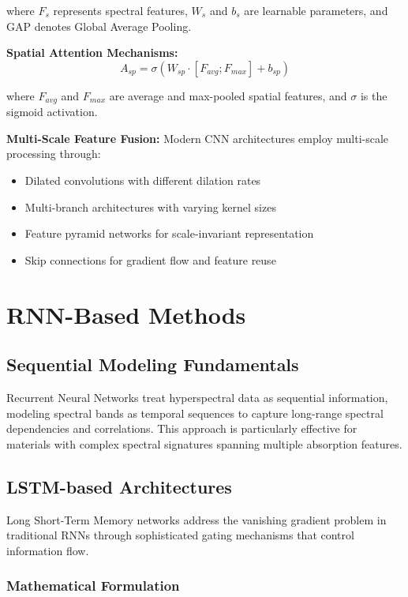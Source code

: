 \documentclass[journal]{IEEEtran}
\begin{document}
where $F_s$ represents spectral features, $W_s$ and $b_s$ are learnable parameters, and GAP denotes Global Average Pooling.

\textbf{Spatial Attention Mechanisms:}
\begin{equation}
A_{sp} = \sigma(W_{sp} \cdot [F_{avg}; F_{max}] + b_{sp})
\end{equation}

where $F_{avg}$ and $F_{max}$ are average and max-pooled spatial features, and $\sigma$ is the sigmoid activation.

\textbf{Multi-Scale Feature Fusion:}
Modern CNN architectures employ multi-scale processing through:
\begin{itemize}
\item Dilated convolutions with different dilation rates
\item Multi-branch architectures with varying kernel sizes
\item Feature pyramid networks for scale-invariant representation
\item Skip connections for gradient flow and feature reuse
\end{itemize}

\section{RNN-Based Methods}

\subsection{Sequential Modeling Fundamentals}

Recurrent Neural Networks treat hyperspectral data as sequential information, modeling spectral bands as temporal sequences to capture long-range spectral dependencies and correlations. This approach is particularly effective for materials with complex spectral signatures spanning multiple absorption features.

\subsection{LSTM-based Architectures}

Long Short-Term Memory networks address the vanishing gradient problem in traditional RNNs through sophisticated gating mechanisms that control information flow.

\subsubsection{Mathematical Formulation}
\end{document}
